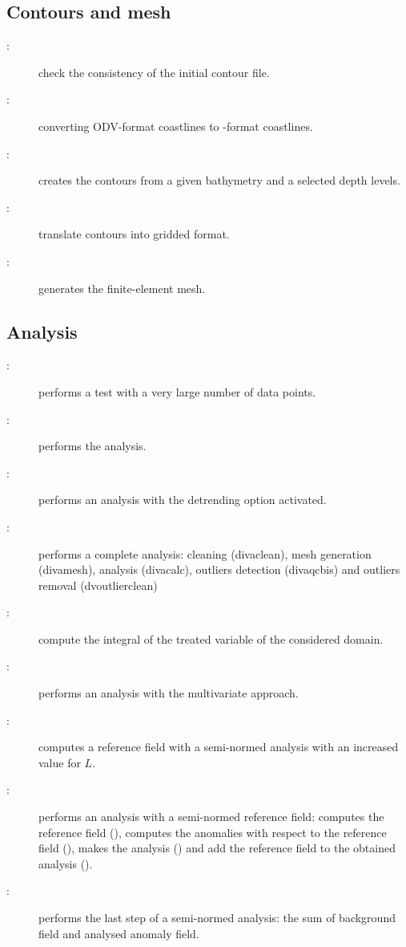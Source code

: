 \subsection{Contours and mesh}

\begin{description}
\item[:] check the consistency of the initial contour file.
\item[:] converting ODV-format coastlines to \diva-format coastlines.
\item[:] creates the contours from a given bathymetry and a selected depth levels.
\item[:] translate contours into gridded format.
\item[:] generates the finite-element mesh.
\end{description}

\subsection{Analysis}

\begin{description}
\item[:] performs a test with a very large number of data points.
\item[:] performs the \diva analysis.
\item[:] performs an analysis with the detrending option activated.
\item[:] performs a complete analysis: cleaning (divaclean), mesh generation (divamesh), analysis (divacalc), outliers detection (divaqcbis) and outliers removal (dvoutlierclean)
\item[:] compute the integral of the treated variable of the considered domain.
\item[:] performs an analysis with the multivariate approach.
\item[:] computes a reference field with a semi-normed analysis with an increased value for $L$.
\item[:] performs an analysis with a semi-normed reference field: computes the reference field (), computes the anomalies with respect to the reference field (), makes the analysis () and add the reference field to the obtained analysis ().
\item[:] performs the last step of a semi-normed analysis: the sum of background field and analysed anomaly field.
\end{description}

